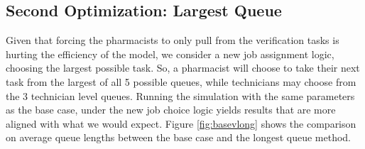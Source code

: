 \documentclass[10pt]{report}            %
\begin{document}
\subsection*{Second Optimization: Largest Queue}
Given that forcing the pharmacists to only pull from the verification tasks is hurting the efficiency of the model, we consider a new job assignment logic, choosing the largest possible task. So, a pharmacist will choose to take their next task from the largest of all 5 possible queues, while technicians may choose from the 3 technician level queues. Running the simulation with the same parameters as the base case, under the new job choice logic yields results that are more aligned with what we would expect. Figure \ref{fig:basevlong} shows the comparison on average queue lengths between the base case and the longest queue method.
\end{document}
